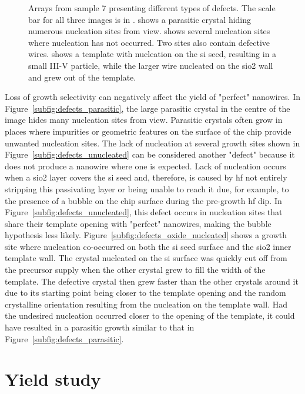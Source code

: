 \begin{figure}
{    }
    \caption[Arrays from sample 7 presenting different types of defects.]{Arrays from sample 7 presenting different types of defects. The scale bar for all three images is in .  shows a parasitic crystal hiding numerous nucleation sites from view.  shows several nucleation sites where nucleation has not occurred. Two sites also contain defective wires.  shows a template with nucleation on the \acs{si} seed, resulting in a small III-V particle, while the larger wire nucleated on the \acs{sio2} wall and grew out of the template.}
    \label{fig:defects}
\end{figure}

Loss of growth selectivity can negatively affect the yield of "perfect" nanowires. In Figure~\ref{subfig:defects_parasitic}, the large parasitic crystal in the centre of the image hides many nucleation sites from view. Parasitic crystals often grow in places where impurities or geometric features on the surface of the chip provide unwanted nucleation sites. The lack of nucleation at several growth sites shown in Figure~\ref{subfig:defects_unucleated} can be considered another "defect" because it does not produce a nanowire where one is expected. Lack of nucleation occurs when a \acs{sio2} layer covers the \acl{si} seed and, therefore, is caused by \acf{hf} not entirely stripping this passivating layer or being unable to reach it due, for example, to the presence of a bubble on the chip surface during the pre-growth \acs{hf} dip. In Figure~\ref{subfig:defects_unucleated}, this defect occurs in nucleation sites that share their template opening with "perfect" nanowires, making the bubble hypothesis less likely. Figure~\ref{subfig:defects_oxide_nucleated} shows a growth site where nucleation co-occurred on both the \acl{si} seed surface and the \acs{sio2} inner template wall. The crystal nucleated on the \acl{si} surface was quickly cut off from the precursor supply when the other crystal grew to fill the width of the template. The defective crystal then grew faster than the other crystals around it due to its starting point being closer to the template opening and the random crystalline orientation resulting from the nucleation on the template wall. Had the undesired nucleation occurred closer to the opening of the template, it could have resulted in a parasitic growth similar to that in Figure~\ref{subfig:defects_parasitic}.

\section{Yield study}

